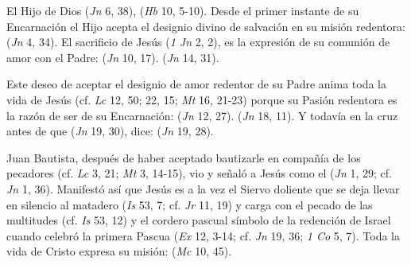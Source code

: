 \begin{ccebody}
\newpage
{}


 El Hijo de Dios  (\textit{Jn} 6, 38),  (\textit{Hb} 10, 5-10). Desde el primer instante de su Encarnación el Hijo acepta el designio divino de salvación en su misión redentora:  (\textit{Jn} 4, 34). El sacrificio de Jesús  (\textit{1 Jn} 2, 2), es la expresión de su comunión de amor con el Padre:  (\textit{Jn} 10, 17).  (\textit{Jn} 14, 31).

 Este deseo de aceptar el designio de amor redentor de su Padre anima toda la vida de Jesús (cf. \textit{Lc} 12, 50; 22, 15; \textit{Mt} 16, 21-23) porque su Pasión redentora es la razón de ser de su Encarnación:  (\textit{Jn} 12, 27).  (\textit{Jn} 18, 11). Y todavía en la cruz antes de que  (\textit{Jn} 19, 30), dice:  (\textit{Jn} 19, 28).


 Juan Bautista, después de haber aceptado bautizarle en compañía de los pecadores (cf. \textit{Lc} 3, 21; \textit{Mt} 3, 14-15), vio y señaló a Jesús como el  (\textit{Jn} 1, 29; cf. \textit{Jn} 1, 36). Manifestó así que Jesús es a la vez el Siervo doliente que se deja llevar en silencio al matadero (\textit{Is} 53, 7; cf. \textit{Jr} 11, 19) y carga con el pecado de las multitudes (cf. \textit{Is} 53, 12) y el cordero pascual símbolo de la redención de Israel cuando celebró la primera Pascua (\textit{Ex} 12, 3-14; cf. \textit{Jn} 19, 36; \textit{1 Co} 5, 7). Toda la vida de Cristo expresa su misión:  (\textit{Mc} 10, 45).


\end{ccebody}
